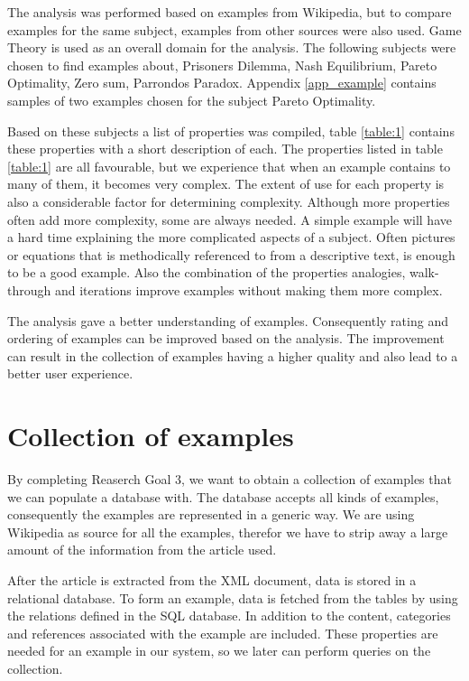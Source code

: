 The analysis was performed based on examples from Wikipedia, but to compare examples for the same subject, examples from other sources were also used. Game Theory is used as an overall domain for the analysis. The following subjects were chosen to find examples about, Prisoners Dilemma, Nash Equilibrium, Pareto Optimality, Zero sum, Parrondos Paradox. Appendix \ref{app_example} contains samples of two examples chosen for the subject Pareto Optimality. 

Based on these subjects a list of properties was compiled, table \ref{table:1} contains these properties with a short description of each. The properties listed in table \ref{table:1} are all favourable, but we experience that when an example contains to many of them, it becomes very complex. The extent of use for each property is also a considerable factor for determining complexity. Although more properties often add more complexity, some are always needed. A simple example will have a hard time explaining the more complicated aspects of a subject. Often pictures or equations that is methodically referenced to from a descriptive text, is enough to be a good example. Also the combination of the properties analogies, walk-through and iterations improve examples without making them more complex. 

The analysis gave a better understanding of examples. Consequently rating and ordering of examples can be improved based on the analysis. 
The improvement can result in the collection of examples having a higher quality and also lead to a better user experience. 


\section{Collection of examples}
By completing Reaserch Goal 3, we want to obtain a collection of examples that we can populate a database with. The database accepts all kinds of examples, consequently the examples are represented in a generic way. We are using Wikipedia as source for all the examples, therefor we have to strip away a large amount of the information from the article used. 

After the article is extracted from the XML document, data is stored in a relational database. To form an example, data is fetched from the tables by using the relations defined in the SQL database. In addition to the content, categories and references associated with the example are included. These properties are needed for an example in our system, so we later can perform queries on the collection.

